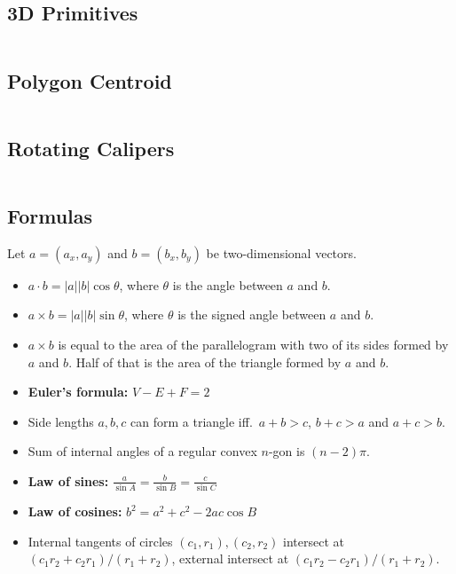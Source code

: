 \documentclass[8pt,a4paper,landscape,oneside]{amsart}
\newcommand{\code}[1]{\inputminted[fontsize=\normalsize,baselinestretch=1]{cpp}{_code/#1}}
\newif\ifverbose
\begin{document}
\begin{multicols*}{3}
    \subsection{3D Primitives}
        \ifverbose
        Three-dimensional geometry primitives.
        \fi
        \code{geometry/primitives3d.cpp}

    \subsection{Polygon Centroid}
        \code{geometry/polygon_centroid.cpp}

    \subsection{Rotating Calipers}
        \code{geometry/rotating_calipers.cpp}

    \subsection{Formulas}
        Let $a = (a_x, a_y)$ and $b = (b_x, b_y)$ be two-dimensional vectors.
        \begin{itemize}
            \item $a\cdot b = |a||b|\cos{\theta}$, where $\theta$ is the angle
                between $a$ and $b$.
            \item $a\times b = |a||b|\sin{\theta}$, where $\theta$ is the
                signed angle between $a$ and $b$.
            \item $a\times b$ is equal to the area of the parallelogram with
                two of its sides formed by $a$ and $b$. Half of that is the
                area of the triangle formed by $a$ and $b$.
            \item \textbf{Euler's formula:} $V - E + F = 2$
            \item Side lengths $a,b,c$ can form a triangle iff.\ $a+b>c$, $b+c>a$ and $a+c>b$.
            \item Sum of internal angles of a regular convex $n$-gon is $(n-2)\pi$.
            \item \textbf{Law of sines:} $\frac{a}{\sin A} = \frac{b}{\sin B} = \frac{c}{\sin C}$
            \item \textbf{Law of cosines:} $b^2 = a^2 + c^2 - 2ac\cos B$
            \item Internal tangents of circles $(c_1,r_1), (c_2,r_2)$ intersect at $(c_1r_2+c_2r_1)/(r_1+r_2)$, external intersect at $(c_1r_2-c_2r_1)/(r_1+r_2)$.
        \end{itemize}



\end{multicols*}
\end{document}
